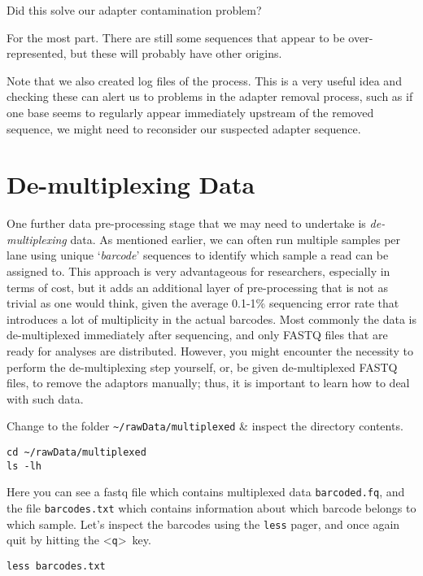 \begin{questions}
Did this solve our adapter contamination problem?
\begin{answer}
For the most part.
There are still some sequences that appear to be over-represented, but these will probably have other origins.
\end{answer}
\end{questions}

\begin{information}
Note that we also created log files of the process.
This is a very useful idea and checking these can alert us to problems in the adapter removal process, such as if one base seems to regularly appear immediately upstream of the removed sequence, we might need to reconsider our suspected adapter sequence.
\end{information}

\section{De-multiplexing Data}

\begin{note}
One further data pre-processing stage that we may need to undertake is \textit{de-multiplexing} data.
As mentioned earlier, we can often run multiple samples per lane using unique `\textit{barcode}' sequences to identify which sample a read can be assigned to.
This approach is very advantageous for researchers, especially in terms of cost, but it adds an additional layer of pre-processing that is not as trivial as one would think, given the average 0.1-1\% sequencing error rate that introduces a lot of multiplicity in the actual barcodes. 
Most commonly the data is de-multiplexed immediately after sequencing, and only FASTQ files that are ready for analyses are distributed. 
However, you might encounter the necessity to perform the de-multiplexing step yourself, or, be given de-multiplexed FASTQ files, to remove the adaptors manually; thus, it is important to learn how to deal with such data. \\
\end{note}

\begin{steps}
Change to the folder \texttt{\~{}/rawData/multiplexed} \& inspect the directory contents.
\begin{lstlisting}
cd ~/rawData/multiplexed
ls -lh
\end{lstlisting}
Here you can see a fastq file which contains multiplexed data \texttt{barcoded.fq}, and the file \texttt{barcodes.txt} which contains information about which barcode belongs to which sample.
Let's inspect the barcodes using the \texttt{less} pager, and once again quit by hitting the \textless \texttt{q}\textgreater ~key.
\begin{lstlisting}
less barcodes.txt
\end{lstlisting}
\end{steps}

